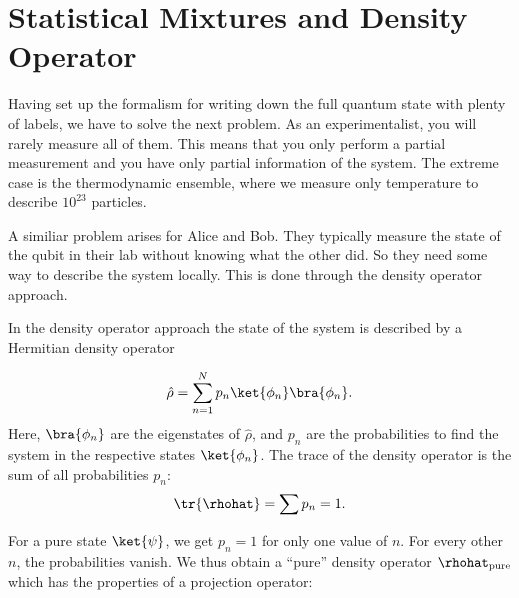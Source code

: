 \section{Statistical Mixtures and Density Operator}

Having set up the formalism for writing down the full quantum state with plenty of labels, we have to solve the next problem. As an experimentalist, you will rarely measure all of them. This means that you only perform a partial measurement and you have only partial information of the system. The extreme case is the thermodynamic ensemble, where we measure only temperature to describe $10^{23}$ particles.

A similiar problem arises for Alice and Bob. They typically measure the state of the qubit in their lab without knowing what the other did. So they need some way to describe the system locally. This is done through the density operator approach.

In the density operator approach the state of the system is described by a Hermitian density operator

\begin{align}
 \hat{\rho} = \sum_{n=1}^N p_n \ket{\phi_n}\bra{\phi_n}.
\end{align}
Here, $\bra{\phi_n}$ are the eigenstates of $\hat{\rho}$, and $p_n$ are the probabilities to find the system in the respective states $\ket{\phi_n}$. The trace of the density operator is the sum of all probabilities $p_n$:
\begin{align}
  \tr{\rhohat} = \sum p_n = 1.
\end{align}

For a pure state $\ket{\psi}$, we get $p_n=1$ for only one value of $n$. For every other $n$, the probabilities vanish. We thus obtain a ``pure'' density operator $\rhohat_{\text{pure}}$ which has the properties of a projection operator:

